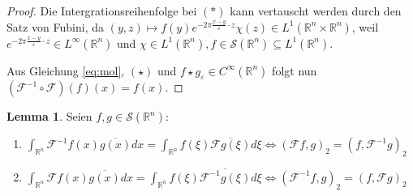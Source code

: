 \documentclass{article}
\newcommand{\R}[0]{\mathbb{R}}
\newcommand{\F}[0]{\mathcal{F}}
\newcommand{\Ssp}[0]{\mathcal{S}}
\theoremstyle{plain}
\theoremstyle{definition}
\newtheorem{lemma}[thm]{Lemma}
\begin{document}
\begin{proof}
    Die Intergrationsreihenfolge bei $(*)$ kann vertauscht werden durch den Satz von Fubini,
    da $(y, z) \mapsto f(y) e^{-2 \pi \frac{x - y}{\varepsilon} \cdot z}\chi(z) \in L^1(\R^n \times \R^n)$, weil $e^{-2 \pi \frac{x - y}{\varepsilon} \cdot z} \in L^{\infty}(\R^n)$ und $\chi \in L^1(\R^n),f \in \Ssp(\R^n) \subseteq L^1(\R^n)$.
    
    Aus Gleichung \ref{eq:mol}, $(\star)$ und $f \star g_{\varepsilon} \in C^{\infty}(\R^n)$ folgt nun $(\F^{-1} \circ \F)(f)(x) = f(x)$.
\end{proof}

\begin{lemma}\label{lem:Ssp1}
    Seien $f,g \in \Ssp(\R^n)$:
    \begin{enumerate}
        \item $\int_{\R^n}\F^{-1}f(x)\overline{g(x)}dx = \int_{\R^n}f(\xi)\overline{\F g(\xi)} d\xi \iff (\F f, g)_2 = (f, \F^{-1}g)_2$
        \item $\int_{\R^n}\F f(x)\overline{g(x)}dx = \int_{\R^n}f(\xi)\overline{\F^{-1} g(\xi)} d\xi \iff (\F^{-1} f, g)_2 = (f, \F g)_2$
    \end{enumerate}
\end{lemma}
\end{document}
